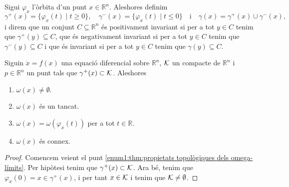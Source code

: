 \documentclass[../../main.tex]{subfiles}
\begin{document}
    \begin{definition}
        \label{def:conjunt positivament invariant}
        \label{def:conjunt negativament invariant}
        \label{def:conjunt invariant}
        Sigui \(\varphi_{x}\) l'òrbita d'un punt \(x\in\mathbb{R}^{n}\).
        Aleshores definim
        \[
            \gamma^{+}(x)=\{\varphi_{x}(t)\mid t\geq0\},\quad\gamma^{-}(x)=\{\varphi_{x}(t)\mid t\leq0\}\quad\text{i}\quad\gamma(x)=\gamma^{+}(x)\cup\gamma^{-}(x),
        \]
        i direm que un conjunt \(C\subseteq\mathbb{R}^{n}\) és positivament invariant si per a tot \(y\in C\) tenim que \(\gamma^{+}(y)\subseteq C\), que és negativament invariant si per a tot \(y\in C\) tenim que \(\gamma^{-}(y)\subseteq C\) i que és invariant si per a tot \(y\in C\) tenim que \(\gamma(y)\subseteq C\).
    \end{definition}
    \begin{theorem}
        \label{thm:propietats topològiques dels omega-límits}
        Siguin
        \(\dot{x}=f(x)\)
        una equació diferencial sobre \(\mathbb{R}^{n}\), \(\mathcal{K}\) un compacte de \(\mathbb{R}^{n}\) i \(p\in\mathbb{R}^{n}\) un punt tals que \(\gamma^{+}(x)\subset\mathcal{K}\).
        Aleshores
        \begin{enumerate}
            \item\label{enum1:thm:propietats topològiques dels omega-límits} \(\omega(x)\neq\emptyset\).
            \item\label{enum2:thm:propietats topològiques dels omega-límits} \(\omega(x)\) és un tancat.
            \item\label{enum3:thm:propietats topològiques dels omega-límits} \(\omega(x)=\omega(\varphi_{x}(t))\) per a tot \(t\in\mathbb{R}\).
            \item\label{enum4:thm:propietats topològiques dels omega-límits} \(\omega(x)\) és connex.
        \end{enumerate}
        \begin{proof}
            Comencem veient el punt \eqref{enum1:thm:propietats topològiques dels omega-límits}.
            Per hipòtesi tenim que \(\gamma^{+}(x)\subset\mathcal{K}\).
            Ara bé, tenim que \(\varphi_{x}(0)=x\in\gamma^{+}(x)\), i per tant \(x\in\mathcal{K}\) i tenim que \(\mathcal{K}\neq\emptyset\).
        \end{proof}
    \end{theorem}
\end{document}
